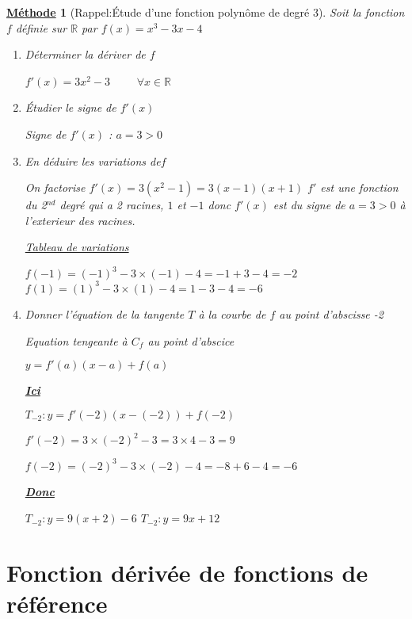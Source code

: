 \documentclass[11pt,a4paper]{article}
\def\R{{\mathbb R}}
\theoremstyle{break}
\newtheorem{Meth}{\underline{Méthode}}
\begin{document}
\newpage
\begin{Meth}[Rappel:Étude d'une fonction polynôme de degré 3]
Soit la fonction $f$ définie sur $\R$ par $f(x)=x^3-3x-4$
\begin{enumerate}
	\item Déterminer la dériver de $f$ \par
		$f'(x) = 3x^2-3$ ~~~~$\forall x \in \R $ 
	\item Étudier le signe de $f'(x)$ \par
	Signe de $f'(x)$ : $a=3>0$
	\item En déduire les variations de$f$\par
	On factorise $f'(x) = 3(x^2-1) = 3(x-1)(x+1)$
	$f'$ est une fonction du 2$^{nd}$ degré qui a 2 racines, $1$ et $-1$ donc $f'(x)$ est du signe de $a=3>0$ à l'exterieur des racines.\par
		\begin{center}
				\underline{Tableau de variations}

			\setlength{\columnseprule}{0.4pt}
    \end{center}
	$f(-1) = (-1)^3 - 3 \times (-1) - 4 = -1 + 3 - 4 = -2$
	$f(1) = (1)^3 - 3 \times (1) - 4 = 1 - 3 - 4 = -6$
	
	\item Donner l'équation de la tangente $T$ à la courbe de $f$ au point d'abscisse -2 \par
	Equation tengeante à $C_f$ au point d'abscice \par
	$y = f'(a)(x-a)+f(a)$ \par
	\textbf{\underline{Ici}} \par
	$T_{-2}: y = f'(-2)(x-(-2))+f(-2)$\par
	$f'(-2) = 3 \times (-2)^2 - 3 = 3 \times 4 - 3 = 9 $\par
	$f(-2) =  (-2)^3 - 3 \times (-2) -4 = -8 + 6 - 4 = -6 $\par
	\textbf{\underline{Donc}}\par
	 $T_{-2}: y = 9(x+2)-6$
	 $T_{-2}: y = 9x+12$
\end{enumerate}
\end{Meth}
\newpage
\section{Fonction dérivée de fonctions de référence} 
\end{document}
